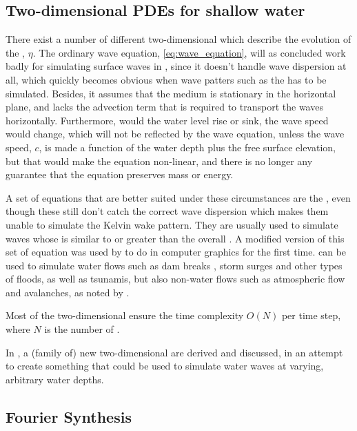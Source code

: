 \subsection{Two-dimensional PDEs for shallow water}

There exist a number of different two-dimensional \PDEs which describe the evolution of the , $\eta$. The ordinary wave equation, \eqref{eq:wave_equation}, will as concluded work badly for simulating surface waves in , since it doesn't handle wave dispersion at all, which quickly becomes obvious when wave patters such as the  has to be simulated. Besides, it assumes that the medium is stationary in the horizontal plane, and lacks the advection term that is required to transport the waves horizontally. Furthermore, would the water level rise or sink, the wave speed would change, which will not be reflected by the wave equation, unless the wave speed, $c$, is made a function of the water depth plus the free surface elevation, but that would make the equation non-linear, and there is no longer any guarantee that the equation preserves mass or energy.

A set of equations that are better suited under these circumstances are the , even though these still don't catch the correct wave dispersion which makes them unable to simulate the Kelvin wake pattern. They are usually used to simulate waves whose \wavelength is similar to or greater than the overall  \citep{Thurey2006}. A modified version of this set of equation was used by \citet{Kass1990} to do \SWS in computer graphics for the first time. \SWS can be used to simulate water flows such as dam breaks \citep{Brodtkorb2010,Brodtkorb2012}, storm surges and other types of floods, as well as tsunamis, but also non-water flows such as atmospheric flow and avalanches, as noted by \citet{Brodtkorb2011}.

Most of the two-dimensional \PDEs ensure the time complexity $O(N)$ per time step, where $N$ is the number of .

In , a (family of) new two-dimensional \PDEs are derived and discussed, in an attempt to create something that could be used to simulate water waves at varying, arbitrary water depths.

\subsection{Fourier Synthesis}

